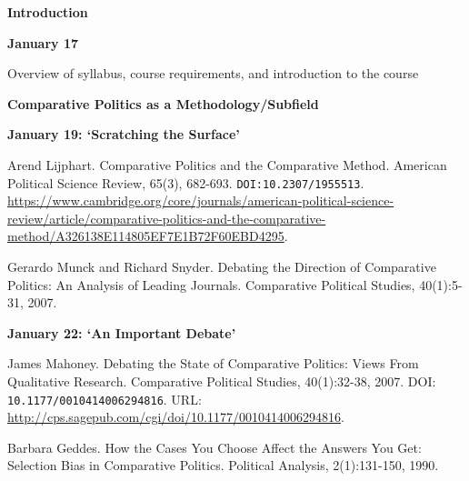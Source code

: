 \documentclass[letterpaper]{article}
\renewenvironment{itemize}{
  \begin{list}{}{
    \setlength{\leftmargin}{1.5em}
  }
}{
  \end{list}
}
\begin{document}
\begin{enumerate}

\item[] {\bf Introduction}
	\begin{itemize}
		\item {\bf January 17}
			\begin{itemize}
				\item[$\bullet$] Overview of syllabus, course requirements, and introduction to the course
			\end{itemize}
	\end{itemize}


\item {\bf Comparative Politics as a Methodology/Subfield}
	\begin{itemize}
		\item {\bf January 19: `Scratching the Surface'}
		\begin{itemize}
			\item[$\bullet$] Arend Lijphart. Comparative Politics and the Comparative Method. American Political Science Review, 65(3), 682-693. \texttt{DOI:10.2307/1955513}. \url{https://www.cambridge.org/core/journals/american-political-science-review/article/comparative-politics-and-the-comparative-method/A326138E114805EF7E1B72F60EBD4295}.
			\item[$\bullet$] Gerardo Munck and Richard Snyder. Debating the Direction of Comparative Politics: An Analysis of Leading Journals. Comparative Political Studies, 40(1):5-31, 2007.
		\end{itemize}
		
		\item {\bf January 22: `An Important Debate'}
			\begin{itemize}
				\item[$\bullet$] James Mahoney. Debating the State of Comparative Politics: Views From Qualitative Research. Comparative Political Studies, 40(1):32-38, 2007. DOI: \texttt{10.1177/0010414006294816}. URL: \url{http://cps.sagepub.com/cgi/doi/10.1177/0010414006294816}.
				\item[$\bullet$] Barbara Geddes. How the Cases You Choose Affect the Answers You Get: Selection Bias in Comparative Politics. Political Analysis, 2(1):131-150, 1990.
			\end{itemize}


\end{itemize}
\end{enumerate}
\end{document}
